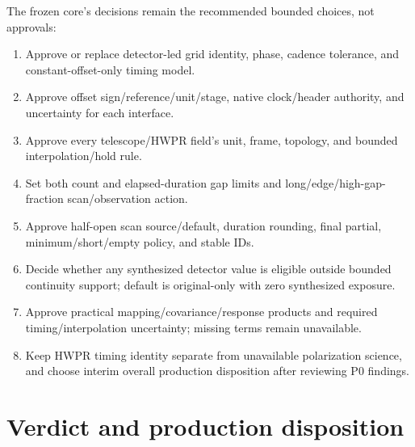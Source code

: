 \documentclass[11pt]{article}
\begin{document}
The frozen core's decisions remain the recommended bounded choices, not
approvals:

\begin{enumerate}[label=OD\arabic*.,leftmargin=2.6em]
\item Approve or replace detector-led grid identity, phase, cadence tolerance,
and constant-offset-only timing model.
\item Approve offset sign/reference/unit/stage, native clock/header authority,
and uncertainty for each interface.
\item Approve every telescope/HWPR field's unit, frame, topology, and bounded
interpolation/hold rule.
\item Set both count and elapsed-duration gap limits and long/edge/high-gap-
fraction scan/observation action.
\item Approve half-open scan source/default, duration rounding, final partial,
minimum/short/empty policy, and stable IDs.
\item Decide whether any synthesized detector value is eligible outside
bounded continuity support; default is original-only with zero synthesized
exposure.
\item Approve practical mapping/covariance/response products and required
timing/interpolation uncertainty; missing terms remain unavailable.
\item Keep HWPR timing identity separate from unavailable polarization science,
and choose interim overall production disposition after reviewing P0 findings.
\end{enumerate}

\section{Verdict and production disposition}
\end{document}
